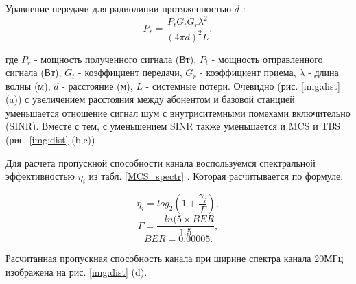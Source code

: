Уравнение передачи для радиолинии протяженностью $d$ \cite{Friis}:
\begin{equation}\label{eq:friisNew}
P_{r}=\frac{P_{t}G_{t}G_{r}\lambda^{2}}{(4\pi d)^{2}L},
\end{equation}

\noindent где $P_{r}$ - мощность полученного сигнала (Вт), $P_{t}$ - мощность отправленного сигнала (Вт), $G_{t}$ - коэффициент передачи, $G_{r}$ - коэффициент приема, $\lambda$ - длина волны (м), $d$ - расстояние (м), $L$ - системные потери. Очевидно (рис. \ref{img:dist} (a)) с увеличением расстояния между абонентом и базовой станцией уменьшается отношение сигнал шум с внутриситемными помехами включительно (SINR). Вместе с тем, с уменьшением SINR также уменьшается и MCS и TBS (рис. \ref{img:dist} (b,c))

Для расчета пропускной способности канала воспользуемся спектральной эффективностью $\eta_{i}$ из табл. \ref{MCS_spectr}  \cite{R1-081483}. Которая расчитывается по формуле:

\begin{equation}\label{eq:spectr1}
\eta_{i}=log_{2}(1+\frac{\gamma_{i}}{\Gamma}),
\end{equation}
\begin{equation}\label{eq:spectr2}
\Gamma=\frac{-ln(5\times BER}{1.5},
\end{equation}
\begin{equation}\label{eq:spectr3}
BER=0.00005.
\end{equation}

Расчитанная пропускная способность канала при ширине спектра канала  20МГц изображена на рис. \ref{img:dist} (d).

\clearpage


